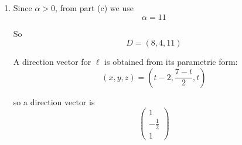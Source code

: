 \documentclass[leqno]{article}
\begin{document}
\begin{enumerate}[
  label=\textbf{\arabic*.},
  leftmargin=*,
  topsep=0pt,
  partopsep=0pt,
  parsep=0pt
]
\begin{djsSolution}
\begin{enumerate}[label=\textbf{(\alph*)}]
Also
\[
D=(8,4,\alpha)
\]

so
\[
\overrightarrow{AD}=\begin{pmatrix}8-9\\4-10\\\alpha-(-1)\end{pmatrix}=\begin{pmatrix}-1\\-6\\\alpha+1\end{pmatrix}
\]

The volume of tetrahedron $ABCD$ is
\[
V=\frac16\left|(\overrightarrow{AB}\times\overrightarrow{AC})\cdot\overrightarrow{AD}\right|
\]

So
\begin{align*}
(\overrightarrow{AB}\times\overrightarrow{AC})\cdot\overrightarrow{AD}
&=\begin{pmatrix}-72\\144\\144\end{pmatrix}\cdot\begin{pmatrix}-1\\-6\\\alpha+1\end{pmatrix}\\
&=72-864+144(\alpha+1)\\
&=72-864+144\alpha+144\\
&=144\alpha-648
\end{align*}

The volume is $156$, so
\[
\frac16|144\alpha-648|=156
\]

So
\[
|144\alpha-648|=936
\]

Divide by $72$:
\[
|2\alpha-9|=13
\]

Hence
\[
2\alpha-9=13
\quad\text{or}\quad
2\alpha-9=-13
\]

giving
\[
\alpha=11
\quad\text{or}\quad
\alpha=-2
\]

\item Since $\alpha>0$, from part (c) we use
\[
\alpha=11
\]

So
\[
D=(8,4,11)
\]

A direction vector for $\ell$ is obtained from its parametric form:
\[
(x,y,z)=\left(t-2,\frac{7-t}{2},t\right)
\]

so a direction vector is
\[
\begin{pmatrix}1\\-\frac12\\1\end{pmatrix}
\]


\end{enumerate}
\end{djsSolution}
\end{enumerate}
\end{document}

